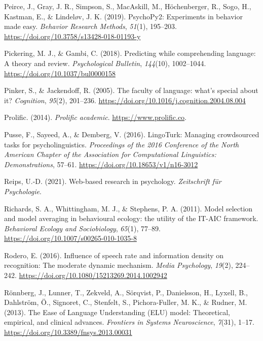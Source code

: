 \documentclass[a4paper, nobind]{templates/ociamthesis}
\newlength{\cslhangindent}
\newenvironment{CSLReferences}[2] %
 {%
  \setlength{\parindent}{0pt}
  \ifodd #1
  \let\oldpar\par
  \def\par{\hangindent=\cslhangindent\oldpar}
  \fi
  \setlength{\parskip}{1mm}
  \setlength{\baselineskip}{6mm}
 }%
 {}
\begin{document}
\begin{CSLReferences}{1}{0}
\leavevmode{}%
Peirce, J., Gray, J. R., Simpson, S., MacAskill, M., Höchenberger, R., Sogo, H., Kastman, E., \& Lindeløv, J. K. (2019). {PsychoPy2: Experiments in behavior made easy}. \emph{Behavior Research Methods}, \emph{51}(1), 195--203. \url{https://doi.org/10.3758/s13428-018-01193-y}

\leavevmode{}%
Pickering, M. J., \& Gambi, C. (2018). Predicting while comprehending language: A theory and review. \emph{Psychological Bulletin}, \emph{144}(10), 1002--1044. \url{https://doi.org/10.1037/bul0000158}

\leavevmode{}%
Pinker, S., \& Jackendoff, R. (2005). The faculty of language: what's special about it? \emph{Cognition}, \emph{95}(2), 201--236. \url{https://doi.org/10.1016/j.cognition.2004.08.004}

\leavevmode{}%
Prolific. (2014). \emph{Prolific academic}. \url{https://www.prolific.co}.

\leavevmode{}%
Pusse, F., Sayeed, A., \& Demberg, V. (2016). {LingoTurk: Managing crowdsourced tasks for psycholinguistics}. \emph{Proceedings of the 2016 Conference of the North American Chapter of the Association for Computational Linguistics: Demonstrations}, 57--61. \url{https://doi.org/10.18653/v1/n16-3012}

\leavevmode{}%
Reips, U.-D. (2021). Web-based research in psychology. \emph{Zeitschrift f{ü}r Psychologie}.

\leavevmode{}%
Richards, S. A., Whittingham, M. J., \& Stephens, P. A. (2011). Model selection and model averaging in behavioural ecology: the utility of the IT-AIC framework. \emph{Behavioral Ecology and Sociobiology}, \emph{65}(1), 77--89. \url{https://doi.org/10.1007/s00265-010-1035-8}

\leavevmode{}%
Rodero, E. (2016). {Influence of speech rate and information density on recognition: The moderate dynamic mechanism}. \emph{Media Psychology}, \emph{19}(2), 224--242. \url{https://doi.org/10.1080/15213269.2014.1002942}

\leavevmode{}%
Rönnberg, J., Lunner, T., Zekveld, A., Sörqvist, P., Danielsson, H., Lyxell, B., Dahlström, Ö., Signoret, C., Stenfelt, S., Pichora-Fuller, M. K., \& Rudner, M. (2013). {The Ease of Language Understanding (ELU) model: Theoretical, empirical, and clinical advances}. \emph{Frontiers in Systems Neuroscience}, \emph{7}(31), 1--17. \url{https://doi.org/10.3389/fnsys.2013.00031}


\end{CSLReferences}
\end{document}
